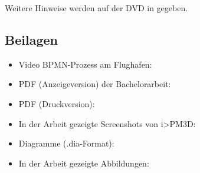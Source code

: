 \documentclass[a4paper,10pt]{sphinxmanual}
\begin{document}
Weitere Hinweise werden auf der DVD in  gegeben.


\subsection{Beilagen}
\label{anhang_b:beilagen}\begin{itemize}
\item {} 
Video BPMN-Prozess am Flughafen: 

\item {} 
PDF (Anzeigeversion) der Bachelorarbeit: 

\item {} 
PDF (Druckversion): 

\item {} 
In der Arbeit gezeigte Screenshots von i\textgreater{}PM3D: 

\item {} 
Diagramme (.dia-Format): 

\item {} 
In der Arbeit gezeigte Abbildungen: 

\end{itemize}



\renewcommand{\indexname}{Stichwortverzeichnis}
\printindex
\end{document}
